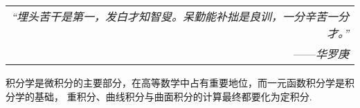 \begin{flushright}
    \begin{tabular}{r|}
        \textit{“埋头苦干是第一，发白才知智叟。呆勤能补拙是良训，一分辛苦一分才。”}\\
        ——\textit{华罗庚}
    \end{tabular}
\end{flushright}

积分学是微积分的主要部分，在高等数学中占有重要地位，而一元函数积分学是积分学的基础，
重积分、曲线积分与曲面积分的计算最终都要化为定积分.
